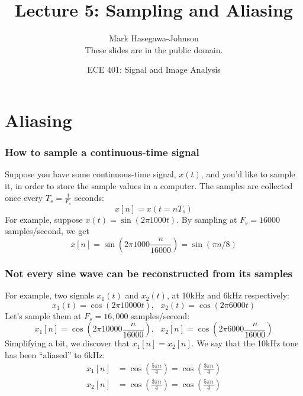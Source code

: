 \documentclass{beamer}
\title{Lecture 5: Sampling and Aliasing}
\author{Mark Hasegawa-Johnson\\These slides are in the public domain.}
\date{ECE 401: Signal and Image Analysis}
\begin{document}
\begin{frame}
  \maketitle
\end{frame}

\begin{frame}
  \tableofcontents
\end{frame}

\section[Aliasing]{Aliasing}
\setcounter{subsection}{1}

\begin{frame}
  \frametitle{How to sample a continuous-time signal}

  Suppose you have some continuous-time signal, $x(t)$, and you'd like
  to sample it, in order to store the sample values in a computer.
  The samples are collected once every $T_s=\frac{1}{F_s}$ seconds:
  \begin{displaymath}
    x[n] = x(t=nT_s)
  \end{displaymath}
  For example, suppose $x(t)=\sin(2\pi 1000t)$.  By sampling at
  $F_s=16000$ samples/second, we get
  \begin{displaymath}
    x[n] = \sin\left(2\pi 1000\frac{n}{16000}\right) = \sin(\pi n/8)
  \end{displaymath}
  
\end{frame}

\begin{frame}
  \frametitle{Not every  sine wave can be reconstructed from its samples}
  
  For example, two signals $x_1(t)$ and $x_2(t)$, at 10kHz and 6kHz respectively:
  \begin{displaymath}
    x_1(t)=\cos(2\pi 10000t),~~~x_2(t)=\cos(2\pi 6000t)
  \end{displaymath}
  Let's sample them at $F_s=16,000$ samples/second:
  \begin{displaymath}
    x_1[n]=\cos\left(2\pi 10000\frac{n}{16000}\right),~~~x_2[n]=\cos\left(2\pi 6000\frac{n}{16000}\right)
  \end{displaymath}
  Simplifying a bit, we discover that $x_1[n]=x_2[n]$.  We say that
  the 10kHz tone has been ``aliased'' to 6kHz:
  \begin{align*}
    x_1[n]&=\cos\left(\frac{5\pi n}{4}\right)=\cos\left(\frac{3\pi n}{4}\right)\\
    x_2[n]&=\cos\left(\frac{3\pi n}{4}\right)=\cos\left(\frac{5\pi n}{4}\right)
  \end{align*}
\end{frame}
\end{document}
